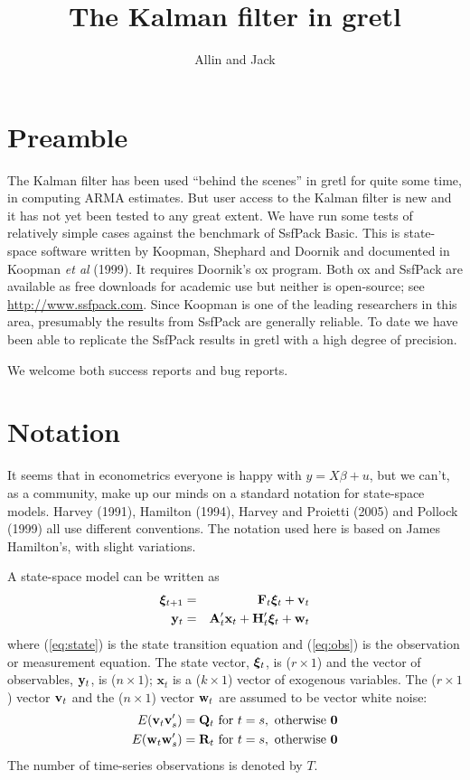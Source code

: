 \documentclass[a4paper]{article}
\title{The Kalman filter in gretl}
\author{Allin and Jack}
\newcommand{\obsvec}{\ensuremath\mathbf{y}}
\newcommand{\obsmat}{\ensuremath\mathbf{H}}
\newcommand{\obsx}{\ensuremath\mathbf{x}}
\newcommand{\obsxmat}{\ensuremath\mathbf{A}}
\newcommand{\obsdist}{\ensuremath\mathbf{w}}
\newcommand{\obsvar}{\ensuremath\mathbf{R}}
\newcommand{\statevec}{\ensuremath\mathbf{\bm \xi}}
\newcommand{\statemat}{\ensuremath\mathbf{F}}
\newcommand{\strdist}{\ensuremath\mathbf{v}}
\newcommand{\strvar}{\ensuremath\mathbf{Q}}
\begin{document}
\maketitle

\section{Preamble}
\label{sec:amble}

The Kalman filter has been used ``behind the scenes'' in gretl for
quite some time, in computing ARMA estimates.  But user access to the
Kalman filter is new and it has not yet been tested to any great
extent.  We have run some tests of relatively simple cases against the
benchmark of \textsf{SsfPack Basic}.  This is state-space software
written by Koopman, Shephard and Doornik and documented in Koopman
\textit{et al} (1999).  It requires Doornik's \textsf{ox} program.
Both \textsf{ox} and \textsf{SsfPack} are available as free downloads
for academic use but neither is open-source; see
\url{http://www.ssfpack.com}.  Since Koopman is one of the leading
researchers in this area, presumably the results from \textsf{SsfPack}
are generally reliable.  To date we have been able to replicate the
\textsf{SsfPack} results in gretl with a high degree of precision.

We welcome both success reports and bug reports.

\section{Notation}

It seems that in econometrics everyone is happy with $y = X \beta +
u$, but we can't, as a community, make up our minds on a standard
notation for state-space models. Harvey (1991), Hamilton (1994),
Harvey and Proietti (2005) and Pollock (1999) all use different
conventions. The notation used here is based on James Hamilton's, with
slight variations.

A state-space model can be written as
\begin{eqnarray}
  \label{eq:state}
  \statevec_{t+1} & = & \statemat_t \statevec_t + \strdist_t \\
  \label{eq:obs}
  \obsvec_t & = & \obsxmat_t'\obsx_t + \obsmat_t' \statevec_t + \obsdist_t
\end{eqnarray}
where (\ref{eq:state}) is the state transition equation and
(\ref{eq:obs}) is the observation or measurement equation.  The state
vector, $\statevec_{t}$, is ($r \times 1$) and the vector of
observables, $\obsvec_t$, is ($n \times 1$); $\mathbf{x}_t$ is a ($k
\times 1$) vector of exogenous variables.  The ($r \times 1$) vector
$\strdist_t$ and the ($n \times 1$) vector $\obsdist_t$ are assumed to
be vector white noise:
%
\begin{eqnarray*}
E(\strdist_t \strdist_s') = \strvar_t \mbox{ for } t = s, 
    \mbox{ otherwise } \mathbf{0} \\
E(\obsdist_t \obsdist_s') = \obsvar_t \mbox{ for } t = s, 
    \mbox{ otherwise } \mathbf{0}
\end{eqnarray*}
%
The number of time-series observations is denoted by $T$.
\end{document}
